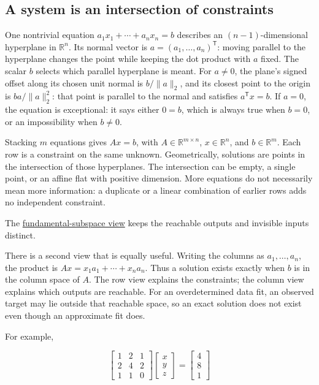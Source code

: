\subsection{A system is an intersection of constraints}\label{a-system-is-an-intersection-of-constraints}

One nontrivial equation \(a_1x_1+\cdots+a_nx_n=b\) describes an \((n-1)\)-dimensional hyperplane in \(\mathbb R^n\). Its normal vector is \(a=(a_1,\ldots,a_n)^\mathsf T\): moving parallel to the hyperplane changes the point while keeping the dot product with \(a\) fixed. The scalar \(b\) selects which parallel hyperplane is meant. For \(a\ne0\), the plane's signed offset along its chosen unit normal is \(b/\|a\|_2\), and its closest point to the origin is \(ba/\|a\|_2^2\): that point is parallel to the normal and satisfies \(a^\mathsf Tx=b\). If \(a=0\), the equation is exceptional: it says either \(0=b\), which is always true when \(b=0\), or an impossibility when \(b\ne0\).

Stacking \(m\) equations gives \(Ax=b\), with \(A\in\mathbb R^{m\times n}\), \(x\in\mathbb R^n\), and \(b\in\mathbb R^m\). Each row is a constraint on the same unknown. Geometrically, solutions are points in the intersection of those hyperplanes. The intersection can be empty, a single point, or an affine flat with positive dimension. More equations do not necessarily mean more information: a duplicate or a linear combination of earlier rows adds no independent constraint.

The \hyperref[01-foundations-i-ch019]{fundamental-subspace view} keeps the reachable outputs and invisible inputs distinct.

There is a second view that is equally useful. Writing the columns as \(a_1,\ldots,a_n\), the product is \(Ax=x_1a_1+\cdots+x_na_n\). Thus a solution exists exactly when \(b\) is in the column space of \(A\). The row view explains the constraints; the column view explains which outputs are reachable. For an overdetermined data fit, an observed target may lie outside that reachable space, so an exact solution does not exist even though an approximate fit does.

For example,

\[
\begin{bmatrix}1&2&1\\2&4&2\\1&1&0\end{bmatrix}
\begin{bmatrix}x\\y\\z\end{bmatrix}
=\begin{bmatrix}4\\8\\1\end{bmatrix}
\]

